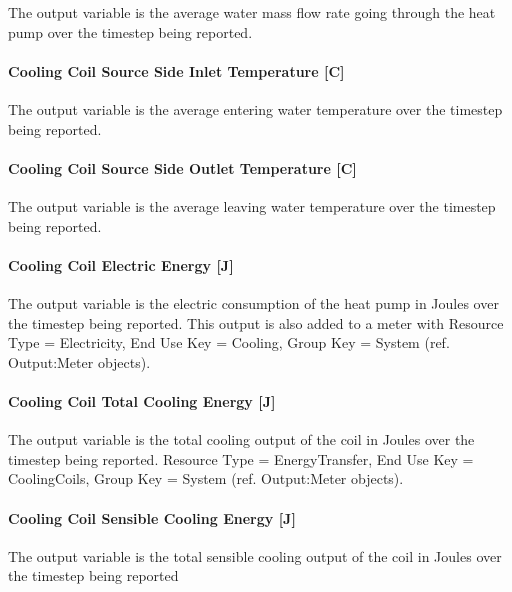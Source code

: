 The output variable is the average water mass flow rate going through the heat pump over the timestep being reported.

\paragraph{Cooling Coil Source Side Inlet Temperature {[}C{]}}\label{cooling-coil-source-side-inlet-temperature-c}

The output variable is the average entering water temperature over the timestep being reported.

\paragraph{Cooling Coil Source Side Outlet Temperature {[}C{]}}\label{cooling-coil-source-side-outlet-temperature-c}

The output variable is the average leaving water temperature over the timestep being reported.

\paragraph{Cooling Coil Electric Energy {[}J{]}}\label{cooling-coil-electric-energy-j-3}

The output variable is the electric consumption of the heat pump in Joules over the timestep being reported. This output is also added to a meter with Resource Type = Electricity, End Use Key = Cooling, Group Key = System (ref. Output:Meter objects).

\paragraph{Cooling Coil Total Cooling Energy {[}J{]}}\label{cooling-coil-total-cooling-energy-j-8}

The output variable is the total cooling output of the coil in Joules over the timestep being reported. Resource Type = EnergyTransfer, End Use Key = CoolingCoils, Group Key = System (ref. Output:Meter objects).

\paragraph{Cooling Coil Sensible Cooling Energy {[}J{]}}\label{cooling-coil-sensible-cooling-energy-j-8}

The output variable is the total sensible cooling output of the coil in Joules over the timestep being reported

